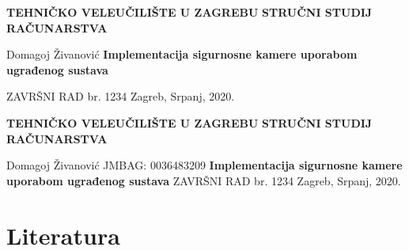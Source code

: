 \documentclass[12pt,a4paper]{article}
\date{}
\newcommand{\collegeName}{TEHNIČKO VELEUČILIŠTE U ZAGREBU}
\newcommand{\smjer}{STRUČNI STUDIJ RAČUNARSTVA}
\newcommand{\radTittle}{Implementacija sigurnosne kamere uporabom ugrađenog sustava}
\newcommand{\radNumber}{1234}
\begin{document}
\begin{center} \obeylines
  {\large \textbf{\collegeName}}
  {\normalsize \textbf{\smjer}}
\end{center}
\begin{center} \obeylines
  \vspace{\fill}
    Domagoj Živanović 
    {\Large \textbf{\radTittle}}
    \item ZAVRŠNI RAD br. \radNumber
  \vspace*{\fill}
  Zagreb, Srpanj, 2020.
\end{center}

\thispagestyle{empty}

\clearpage

\begin{center} \obeylines
  {\large \textbf{\collegeName}}
  {\normalsize \textbf{\smjer}}
\end{center}
\begin{center} \obeylines
  \vspace{\fill}
      Domagoj Živanović
      JMBAG: 0036483209
    {\Large \textbf{\radTittle}}
    ZAVRŠNI RAD br. \radNumber
  \vspace*{\fill}
  Zagreb, Srpanj, 2020.
\end{center}

\thispagestyle{empty}

\clearpage

\tableofcontents
\clearpage

\listoftables
\listoffigures




% 




\section{Literatura}
\printbibliography[heading=none]
\end{document}
